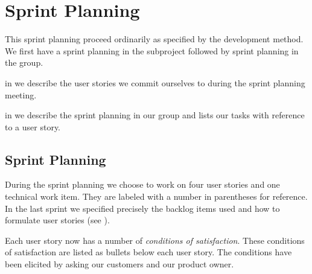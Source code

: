 \chapter{Sprint Planning}\label{chap:s4_sprintplanning}
This sprint planning proceed ordinarily as specified by the development method. We first have a sprint planning in the subproject followed by sprint planning in the group.

\begin{chapterorganization}
  \item in  we describe the user stories we commit ourselves to during the \bd sprint planning meeting.
  \item in  we describe the sprint planning in our group and lists our tasks with reference to a user story.
\end{chapterorganization}

\section{\bdtitle Sprint Planning}\label{sec:S4_bd}
During the \bd sprint planning we choose to work on four user stories and one technical work item. They are labeled with a number in parentheses for reference. In the last sprint we specified precisely the backlog items used and how to formulate user stories (see ).

Each user story now has a number of \emph{conditions of satisfaction}. These conditions of satisfaction are listed as bullets below each user story. The conditions have been elicited by asking our customers and our product owner.

